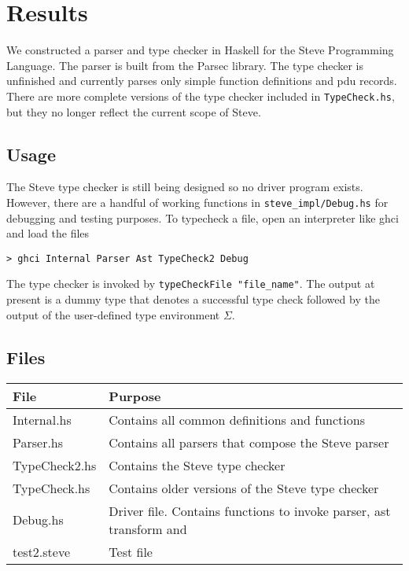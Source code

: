 

\section{Results}

We constructed a parser and type checker in Haskell for the Steve Programming Language. The parser is built from the Parsec library. The type checker is unfinished and currently parses only simple function definitions and pdu records. There are more complete versions of the type checker included in {\tt TypeCheck.hs}, but they no longer reflect the current scope of Steve.

\subsection{Usage}
The Steve type checker is still being designed so no driver program exists. However,
there are a handful of working functions in {\tt steve\_impl/Debug.hs} for debugging and testing purposes. To typecheck a file, open an interpreter like ghci and load the files
\begin{center}
 {\tt \small >~ghci Internal Parser Ast TypeCheck2 Debug} 
\end{center}
The type checker is invoked by {\tt typeCheckFile "file\_name"}. The output at present is a dummy type that denotes a successful type check followed by the output of the user-defined type environment $\Sigma$.

\subsection{Files}
\begin{tabular}{|l|p{5.5cm}|}
\hline
{\bf File}& {\bf Purpose}\\
\hline
Internal.hs & Contains all common definitions and functions\\
\hline
Parser.hs & Contains all parsers that compose the Steve parser\\
\hline
TypeCheck2.hs & Contains the Steve type checker\\
\hline
TypeCheck.hs & Contains older versions of the Steve type checker\\
\hline
Debug.hs & Driver file. Contains functions to invoke parser, ast transform and \\
\hline
test2.steve & Test file\\
\hline
\end{tabular}
